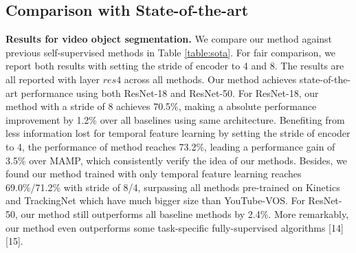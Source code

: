 \documentclass{article}
\begin{document}
\subsection{Comparison with State-of-the-art}
\textbf{Results for video object segmentation.}
We compare our method against previous self-supervised methods in Table \ref{table:sota}. For fair comparison, we report both results with setting the stride of encoder to 4 and 8. The results are all reported with layer $res4$ across all methods. Our method achieves state-of-the-art performance using both ResNet-18 and ResNet-50. For ResNet-18, our method with a stride of 8 achieves 70.5\%, making a absolute performance improvement by 1.2\% over all baselines using same architecture. Benefiting from less information lost for temporal feature learning by setting the stride of encoder to 4, the performance of method reaches 73.2\%, leading a performance gain of 3.5\% over MAMP, which consistently verify the idea of our methods. Besides, we found our method trained with only temporal feature learning  reaches 69.0\%/71.2\% with stride of 8/4, surpassing all methods pre-trained on Kinetics and TrackingNet which have much bigger size than YouTube-VOS. For ResNet-50, our method still outperforms all baseline methods by 2.4\%. More remarkably, our method even outperforms some task-specific fully-supervised algorithms [14][15].
\end{document}
